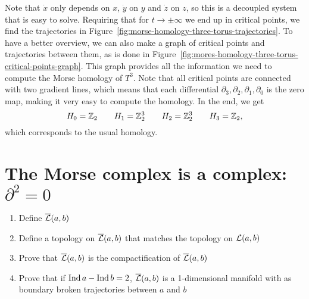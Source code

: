 \begin{eg}
    Note that $\dot x$ only depends on  $x$,  $\dot y$ on  $y$ and  $\dot z$ on $z$, so this is a decoupled system that is easy to solve.
    Requiring that for $t \to  \pm\infty$ we end up in critical points, we find the trajectories in Figure~\ref{fig:morse-homology-three-torus-trajectories}.
    To have a better overview, we can also make a graph of critical points and trajectories between them, as is done in Figure~\ref{fig:mores-homology-three-torus-critical-points-graph}.
    This graph provides all the information we need to compute the Morse homology of $T^{3}$.
    Note that all critical points are connected with two gradient lines, which means that each differential $\partial_3, \partial_{2}, \partial_1, \partial_0$ is the zero map, making it very easy to compute the homology. In the end, we get
    \[
    H_0 = \mathbb{Z}_2 \qquad 
    H_1 = \mathbb{Z}_2^3 \qquad 
    H_2 = \mathbb{Z}_2^3 \qquad 
    H_3 = \mathbb{Z}_2
    ,\] 
    which corresponds to the usual homology.
\end{eg}

\section{The Morse complex is a complex: $\partial^2 = 0$}

\begin{enumerate}
    \item Define $\overline{\mathcal L}(a, b)$ 
    \item Define a topology on $\overline{\mathcal L}(a, b)$ that matches the topology on  $\mathcal L(a, b)$
    \item Prove that  $\overline{\mathcal L}(a, b)$ is the compactification of $\overline{\mathcal L}(a, b)$
    \item Prove that if $\operatorname{Ind} a - \operatorname{Ind} b = 2$, $\overline{\mathcal L}(a, b)$ is a 1-dimensional manifold with as boundary broken trajectories between $a$ and  $b$
\end{enumerate}


